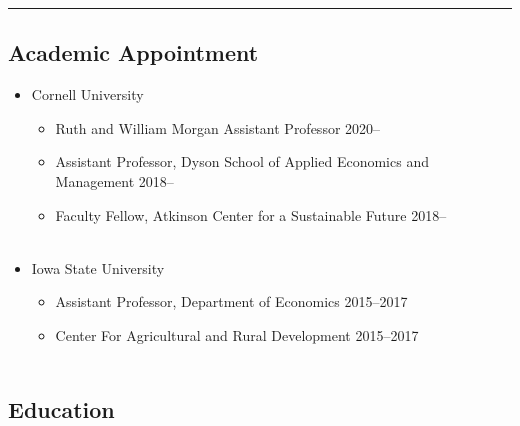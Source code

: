 \documentclass[12pt]{res} %
\begin{document}
\begin{resume}
\vspace{-0.08in}
\hrule
\vspace{-0.1in}

\subsection{Academic Appointment}


	\begin{itemize} \itemsep -12pt
	\item[] Cornell University
		\vspace{-0.05in}
		\begin{itemize} \itemsep -1pt
			\item[] Ruth and William Morgan Assistant Professor \hfill 2020--
			\item[] Assistant Professor, Dyson School of Applied Economics and Management \hfill 2018--
			\item[] Faculty Fellow, Atkinson Center for a Sustainable Future \hfill 2018--\\\
		\end{itemize}
		\item[] Iowa State University
		\vspace{-0.05in}
		\begin{itemize} \itemsep -1pt
			\item[] Assistant Professor, Department of Economics \hfill 2015--2017
			\item[] Center For Agricultural and Rural Development \hfill 2015--2017 \\\
		\end{itemize}
		\vspace{-0.075in}
	\end{itemize}
\vspace{-0.5in}
\subsection{Education}


\end{resume}
\end{document}

